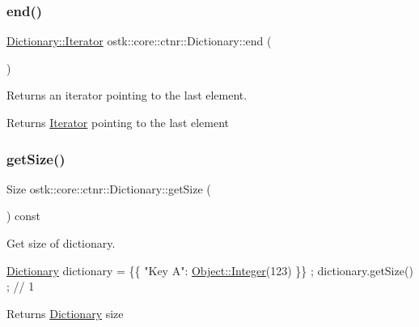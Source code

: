 \subsubsection{\texorpdfstring{end()}{end()}\hspace{0.1cm}{\footnotesize\ttfamily [2/2]}}
{\footnotesize\ttfamily \hyperlink{classostk_1_1core_1_1ctnr_1_1_dictionary_1_1_iterator}{Dictionary\+::\+Iterator} ostk\+::core\+::ctnr\+::\+Dictionary\+::end (\begin{DoxyParamCaption}{ }\end{DoxyParamCaption})}



Returns an iterator pointing to the last element. 

\begin{DoxyReturn}{Returns}
\hyperlink{classostk_1_1core_1_1ctnr_1_1_dictionary_1_1_iterator}{Iterator} pointing to the last element 
\end{DoxyReturn}
\mbox{\label{classostk_1_1core_1_1ctnr_1_1_dictionary_a0c5fb3511a08a43701cd46ebb7110c33}} 
\subsubsection{\texorpdfstring{get\+Size()}{getSize()}}
{\footnotesize\ttfamily Size ostk\+::core\+::ctnr\+::\+Dictionary\+::get\+Size (\begin{DoxyParamCaption}{ }\end{DoxyParamCaption}) const}



Get size of dictionary. 


\begin{DoxyCode}
\hyperlink{classostk_1_1core_1_1ctnr_1_1_dictionary_a17166f1489683b8fcc5da6537f29de13}{Dictionary} dictionary = \{\{ \textcolor{stringliteral}{"Key A"}: \hyperlink{classostk_1_1core_1_1ctnr_1_1_object_af3bef3ae331e8e55662bf91a4cd5026f}{Object::Integer}(123) \}\} ;
dictionary.getSize() ; \textcolor{comment}{// 1}
\end{DoxyCode}


\begin{DoxyReturn}{Returns}
\hyperlink{classostk_1_1core_1_1ctnr_1_1_dictionary}{Dictionary} size 
\end{DoxyReturn}
\mbox{\label{classostk_1_1core_1_1ctnr_1_1_dictionary_a10dbf0010c484a93c1da136b57b6fa59}} 
